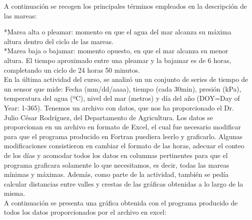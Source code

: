 \documentclass[12pt]{article}
\begin{document}
A continuación se recogen los principales términos empleados en la descripción de las mareas:

*Marea alta o pleamar: momento en que el agua del mar alcanza su máxima altura dentro del ciclo de las mareas.\\
*Marea baja o bajamar: momento opuesto, en que el mar alcanza su menor altura.
El tiempo aproximado entre una pleamar y la bajamar es de 6 horas, completando un ciclo de 24 horas 50 minutos.\\
En la última actividad del curso, se analizó un un conjunto de series de tiempo de un sensor que mide: Fecha (mm/dd/aaaa), tiempo (cada 30min), presión (kPa), temperatura del agua (ºC), nivel del mar (metros) y día del año (DOY=Day of Year: 1-365). Tenemos un archivo con datos, que nos ha proporcionado el Dr. Julio César Rodríguez, del Departamento de Agricultura. Los datos se proporcionan en un archivo en formato de Excel, el cual fue necesario modificar para que el programa producido en Fortran puediera leerlo y graficarlo.
Algunas modificaciones consistieron en cambiar el formato de las horas, adecuar el conteo de los días y acomodar todos los datos en columnas pertinentes para que el programa graficara solamente lo que necesitamos, es decir, todas las mareas mínimas y máximas.
Además, como parte de la actividad, también se pedía calcular distancias entre valles y crestas de las gráficas obtenidas a lo largo de la misma.\\

A continuación se presenta una gráfica obtenida con el programa producido de todos los datos proporcionados por el archivo en excel:
\end{document}
